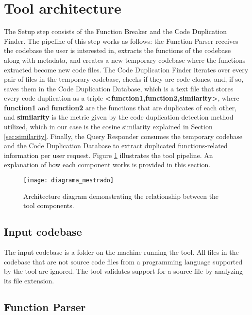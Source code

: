\en

\section{Tool architecture}
\label{subsec:architecture}

The Setup step consists of the Function Breaker and the Code Duplication Finder. The pipeline of this step works as follows: the Function Parser receives the codebase the user is interested in, extracts the functions of the codebase along with metadata, and creates a new temporary codebase where the functions extracted become new code files. The Code Duplication Finder iterates over every pair of files in the temporary codebase, checks if they are code clones, and, if so, saves them in the Code Duplication Database, which is a text file that stores every code duplication as a triple \textbf{<function1,function2,similarity>}, where \textbf{function1} and \textbf{function2} are the functions that are duplicates of each other, and \textbf{similarity} is the metric given by the code duplication detection method utilized, which in our case is the cosine similarity explained in Section \ref{sec:similarity}. Finally, the Query Responder consumes the temporary codebase and the Code Duplication Database to extract duplicated functions-related information per user request. Figure \ref{fig:diagram} illustrates the tool pipeline. An explanation of how each component works is provided in this section.

\begin{figure}
\texttt{[image: diagrama\_mestrado]}
\caption{Architecture diagram demonstrating the relationship between the tool components.}
\label{fig:diagram}
\end{figure}

\subsection{Input codebase}

The input codebase is a folder on the machine running the tool. All files in the codebase that are not source code files from a programming language supported by the tool are ignored. The tool validates support for a source file by analyzing its file extension.

\subsection{Function Parser}

